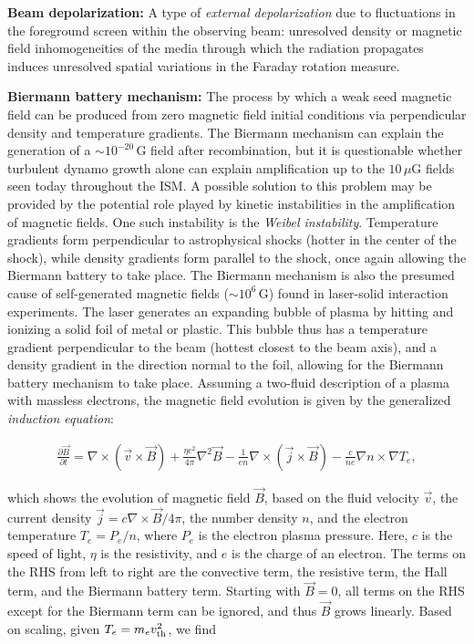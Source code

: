 \documentclass[a4paper,10pt]{article}
\begin{document}
{\noindent}\textbf{Beam depolarization:} A type of \textit{external depolarization} due to fluctuations in the foreground screen within the observing beam: unresolved density or magnetic field inhomogeneities of the media through which the radiation propagates induces unresolved spatial variations in the Faraday rotation measure.

{\noindent}\textbf{Biermann battery mechanism:} The process by which a weak seed magnetic field can be produced from zero magnetic field initial conditions via perpendicular density and temperature gradients. The Biermann mechanism can explain the generation of a $\sim10^{-20}\,$G field after recombination, but it is questionable whether turbulent dynamo growth alone can explain amplification up to the $10\,\mu$G fields seen today throughout the ISM. A possible solution to this problem may be provided by the potential role played by kinetic instabilities in the amplification of magnetic fields. One such instability is the \textit{Weibel instability}. Temperature gradients form perpendicular to astrophysical shocks (hotter in the center of the shock), while density gradients form parallel to the shock, once again allowing the Biermann battery to take place. The Biermann mechanism is also the presumed cause of self-generated magnetic fields ($\sim10^6\,$G) found in laser-solid interaction experiments. The laser generates an expanding bubble of plasma by hitting and ionizing a solid foil of metal or plastic. This bubble thus has a temperature gradient perpendicular to the beam (hottest closest to the beam axis), and a density gradient in the direction normal to the foil, allowing for the Biermann battery mechanism to take place. Assuming a two-fluid description of a plasma with massless electrons, the magnetic field evolution is given by the generalized \textit{induction equation}:

\begin{align*}
    \frac{\partial\vec{B}}{\partial t} = \nabla\times(\vec{v}\times\vec{B}) + \frac{\eta c^2}{4\pi}\nabla^2\vec{B} - \frac{1}{en}\nabla\times(\vec{j}\times\vec{B}) - \frac{c}{ne}\nabla n\times\nabla T_e,
\end{align*}

{\noindent}which shows the evolution of magnetic field $\vec{B}$, based on the fluid velocity $\vec{v}$, the current density $\vec{j}=c\nabla\times\vec{B}/4\pi$, the number density $n$, and the electron temperature $T_e=P_e/n$, where $P_e$ is the electron plasma pressure. Here, $c$ is the speed of light, $\eta$ is the resistivity, and $e$ is the charge of an electron. The terms on the RHS from left to right are the convective term, the resistive term, the Hall term, and the Biermann battery term. Starting with $\vec{B}=0$, all terms on the RHS except for the Biermann term can be ignored, and thus $\vec{B}$ grows linearly. Based on scaling, given $T_e=m_ev_{\rm th}^2$, we find
\end{document}
